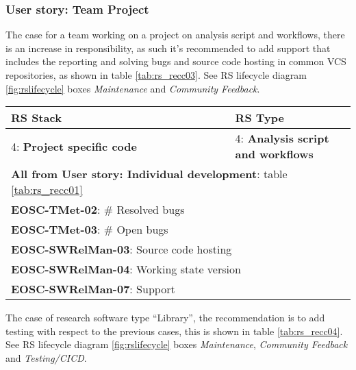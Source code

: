 \subsubsection{User story: Team Project}

The case for a team working on a project on analysis script and workflows, there is an increase in responsibility, as such it's recommended to add support that includes the reporting and solving bugs and source code hosting in common VCS repositories, as shown in table \ref{tab:rs_recc03}. See RS lifecycle diagram \ref{fig:rslifecycle} boxes \textit{Maintenance} and \textit{Community Feedback}.

\begin{center}
  \label{tab:rs_recc03}
  \small
  \begin{tabular}{|p{0.65\linewidth}|p{0.35\linewidth}|} \hline

    \textbf{RS Stack} & \textbf{RS Type} \\ \hline \hline
    4: \textbf{Project specific code} &
    4: \textbf{Analysis script and workflows} \\ \hline \hline
    \multicolumn{2}{|l|}{\textbf{All from User story: Individual development}: table \ref{tab:rs_recc01}} \\ \hline
    \multicolumn{2}{|l|}{\textbf{EOSC-TMet-02}: \# Resolved bugs} \\ \hline
    \multicolumn{2}{|l|}{\textbf{EOSC-TMet-03}: \# Open bugs} \\ \hline
    \multicolumn{2}{|l|}{\textbf{EOSC-SWRelMan-03}: Source code hosting} \\ \hline
    \multicolumn{2}{|l|}{\textbf{EOSC-SWRelMan-04}: Working state version} \\ \hline
    \multicolumn{2}{|l|}{\textbf{EOSC-SWRelMan-07}: Support} \\ \hline

  \end{tabular}
\end{center}

The case of research software type ``Library'', the recommendation is to add testing with respect to the previous cases, this is shown in table \ref{tab:rs_recc04}.
See RS lifecycle diagram \ref{fig:rslifecycle} boxes \textit{Maintenance}, \textit{Community Feedback} and \textit{Testing/CICD}.

